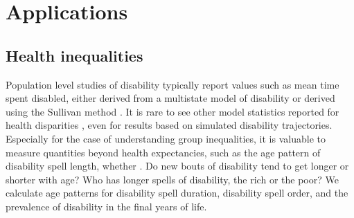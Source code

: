 \documentclass{article}
\begin{document}






\section{Applications}

\subsection{Health inequalities}
Population level studies of disability typically report values such as mean time spent disabled, either derived from a multistate model of disability \citep{crimmins2009change} or derived using the Sullivan method \citep{Sullivan1970,Crimmins1997}. It is rare to see other model statistics reported for health disparities \citep{laditka1998new}, even for results based on simulated disability trajectories. Especially for the case of understanding group inequalities, it is valuable to measure quantities beyond health expectancies, such as the age pattern of disability spell length, whether . Do new bouts of disability tend to get longer or shorter with age? Who has longer spells of disability, the rich or the poor? We calculate age patterns for disability spell duration, disability spell order, and the prevalence of disability in the final years of life.
\end{document}
